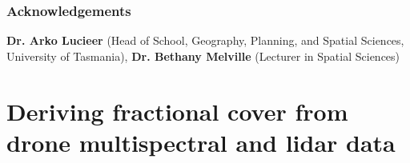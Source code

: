 \documentclass{thesis}
\begin{document}
\clearpage

\section*{Acknowledgements}

\ifdrafting\else
\textbf{Dr. Arko Lucieer} (Head of School, Geography, Planning, and Spatial Sciences, University of Tasmania), 
\textbf{Dr. Bethany Melville} (Lecturer in Spatial Sciences) 

\vspace{5mm}
\begin{quotation}
\end{quotation}

\begin{quotation}
\end{quotation}

\contentspage
\pagestyle{header-footer}

\part{Deriving fractional cover from drone multispectral and lidar data}

\pagestyle{header-footer}
\end{document}
